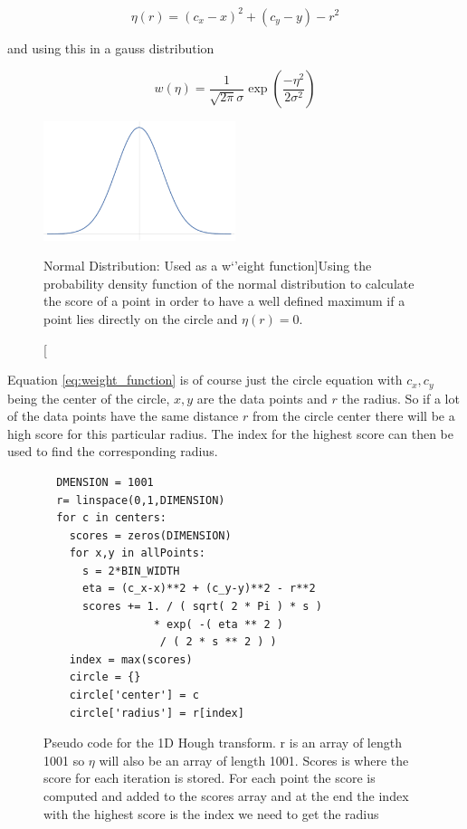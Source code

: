 \documentclass[11pt,twoside]{scrreprt}
\begin{document}
\begin{equation}
\label{eq:score_function}
  \eta(r) = (c_x - x)^2 + (c_y - y) - r ^ 2
\end{equation}

and using this in a gauss distribution

\begin{equation}
\label{eq:weight_function}
  w(\eta) = \frac{1}{\sqrt{2\pi}\sigma}\exp\left( \frac{-\eta^2}{2\sigma^2}\right)
\end{equation}
\begin{figure}[tb]
  \centering
  \includegraphics[width=0.5\textwidth]{pics/gauss}
  \caption[Normal Distribution: Used as a w`'eight function]{Using the probability density function of the normal distribution to calculate the score of a point in order to have a well defined maximum if a point
  lies directly on the circle and $\eta(r) = 0$. }
  \label{fig:gauss}
\end{figure}
Equation \ref{eq:weight_function} is of course just the circle equation with $c_x, c_y$ being the center of the circle, $x, y$ are the data points and $r$ the radius.
So if a lot of the data points have the same distance $r$ from the circle center there will be a high score for this particular radius. The index
for the highest score can then be used to find the corresponding radius.

\begin{figure}
  \begin{lstlisting}
  DMENSION = 1001
  r= linspace(0,1,DIMENSION)
  for c in centers:
    scores = zeros(DIMENSION)
    for x,y in allPoints:
      s = 2*BIN_WIDTH
      eta = (c_x-x)**2 + (c_y-y)**2 - r**2
      scores += 1. / ( sqrt( 2 * Pi ) * s ) 
                 * exp( -( eta ** 2 ) 
                  / ( 2 * s ** 2 ) )
    index = max(scores)
    circle = {}
    circle['center'] = c
    circle['radius'] = r[index]
\end{lstlisting}
\caption[Pseudo Code 1D HT]{Pseudo code for the 1D Hough transform. r is an array of length 1001 so $\eta$ will also be an 
array of length 1001. Scores is where the score for each iteration is stored. For each point the score is computed and added 
to the scores array and at the end the index with the highest score is the index we need to get the radius}
\end{figure}
\end{document}
